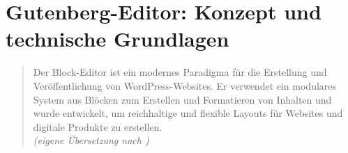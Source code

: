 



















\section{Gutenberg-Editor: Konzept und technische Grundlagen}
\begin{quote}
    Der Block-Editor ist ein modernes Paradigma für die Erstellung und Veröffentlichung von WordPress-Websites.
    Er verwendet ein modulares System aus Blöcken zum Erstellen und Formatieren von Inhalten und wurde entwickelt,
    um reichhaltige und flexible Layouts für Websites und digitale Produkte zu erstellen.
    \\[0.5em]
    \emph{(eigene Übersetzung nach \cite{wordpress2024plugin_blockeditor})}
\end{quote}



